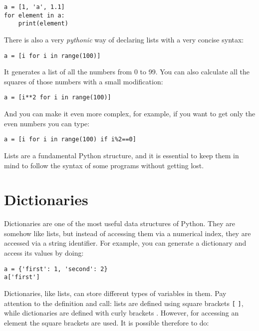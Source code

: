 \begin{verbatim}
a = [1, 'a', 1.1]
for element in a:
    print(element)
\end{verbatim}

There is also a very \emph{pythonic} way of declaring lists with a very concise syntax:

\begin{verbatim}
a = [i for i in range(100)]
\end{verbatim}

It generates a list of all the numbers from 0 to 99. You can also calculate all the squares of those numbers with a small modification:

\begin{verbatim}
a = [i**2 for i in range(100)]
\end{verbatim}

And you can make it even more complex, for example, if you want to get only the even numbers you can type:

\begin{verbatim}
a = [i for i in range(100) if i%2==0]
\end{verbatim}


Lists are a fundamental Python structure, and it is essential to keep them in mind to follow the syntax of some programs without getting lost.

\section{Dictionaries}\label{dictionaries}
Dictionaries are one of the most useful data structures of Python. They are somehow like lists, but instead of accessing them via a numerical index, they are accessed via a string identifier. For example, you can generate a dictionary and access its values by doing:

\begin{verbatim}
a = {'first': 1, 'second': 2}
a['first']
\end{verbatim}

Dictionaries, like lists, can store different types of variables in them. Pay attention to the definition and call: lists are defined using square brackets \texttt{[} \texttt{]}, while dictionaries are defined with curly brackets \texttt{{}}. However, for accessing an element the square brackets are used. It is possible therefore to do:

